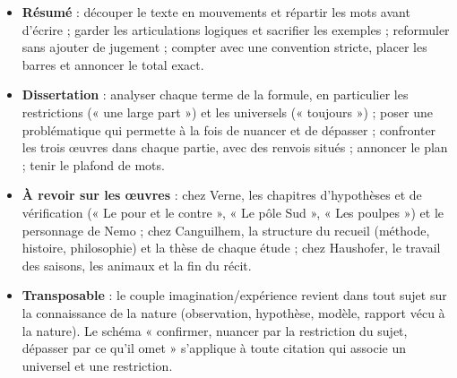 \documentclass[11pt,a4paper]{article}
\providecommand{\tightlist}{\setlength{\itemsep}{0pt}\setlength{\parskip}{0pt}}
\begin{document}
\begin{itemize}
\tightlist
\item
  \textbf{Résumé} : découper le texte en mouvements et répartir les mots avant d'écrire ; garder les articulations logiques et sacrifier les exemples ; reformuler sans ajouter de jugement ; compter avec une convention stricte, placer les barres et annoncer le total exact.
\item
  \textbf{Dissertation} : analyser chaque terme de la formule, en particulier les restrictions (« une large part ») et les universels (« toujours ») ; poser une problématique qui permette à la fois de nuancer et de dépasser ; confronter les trois œuvres dans chaque partie, avec des renvois situés ; annoncer le plan ; tenir le plafond de mots.
\item
  \textbf{À revoir sur les œuvres} : chez Verne, les chapitres d'hypothèses et de vérification (« Le pour et le contre », « Le pôle Sud », « Les poulpes ») et le personnage de Nemo ; chez Canguilhem, la structure du recueil (méthode, histoire, philosophie) et la thèse de chaque étude ; chez Haushofer, le travail des saisons, les animaux et la fin du récit.
\item
  \textbf{Transposable} : le couple imagination/expérience revient dans tout sujet sur la connaissance de la nature (observation, hypothèse, modèle, rapport vécu à la nature). Le schéma « confirmer, nuancer par la restriction du sujet, dépasser par ce qu'il omet » s'applique à toute citation qui associe un universel et une restriction.
\end{itemize}
\end{document}
